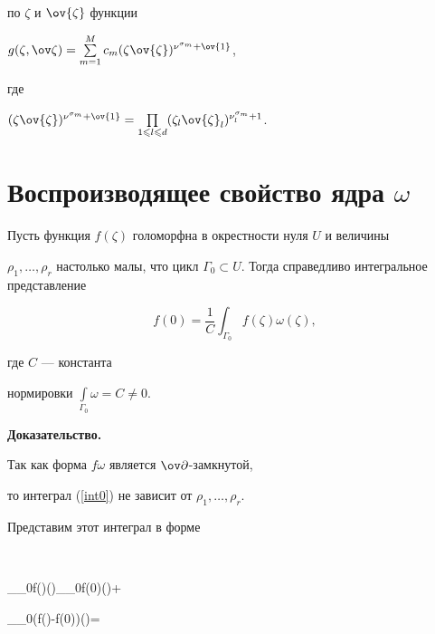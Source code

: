 по $\zeta$ и $\ov{\zeta}$ функции


$g(\zeta,{\ov \zeta})=\sum\limits_{m=1}^{M}


c_m(\zeta\ov{\zeta})^{\nu^{\sigma_m}+\ov{1}}$,


где


$(\zeta\ov{\zeta})^{\nu^{\sigma_m}+\ov{1}}=\prod\limits_{ 1\leqslant


l\leqslant d} (\zeta_l\ov{\zeta}_l)^{\nu_l^{\sigma_m}+1}$.








\section{Воспроизводящее свойство ядра $\omega$}





\begin{prop}


Пусть функция $f(\zeta)$ голоморфна в окрестности нуля $U$ и величины


$\rho_1,\dotsc,\rho_r$ настолько малы, что цикл $\Gamma_0\subset


U$. Тогда справедливо интегральное представление


\begin{equation}


f(0)=\frac1C\int_{\Gamma_0}f(\zeta)\omega(\zeta),


\label{int0}


\end{equation}


где $C$ --- константа 


нормировки $\int\limits_{\Gamma_0}\omega=C\neq 0$.


\end{prop}








{\bf Доказательство.}


Так как форма $f\omega$ является $\ov \partial$-замкнутой,


то интеграл (\ref{int0}) не зависит от $\rho_1,\dotsc,\rho_r$.


Представим этот интеграл в форме


$$


\int_{\Gamma_0}f(\zeta)\omega(\zeta)\int_{\Gamma_0}f(0)\omega(\zeta)+


\int_{\Gamma_0}(f(\zeta)-f(0))\omega(\zeta)=


